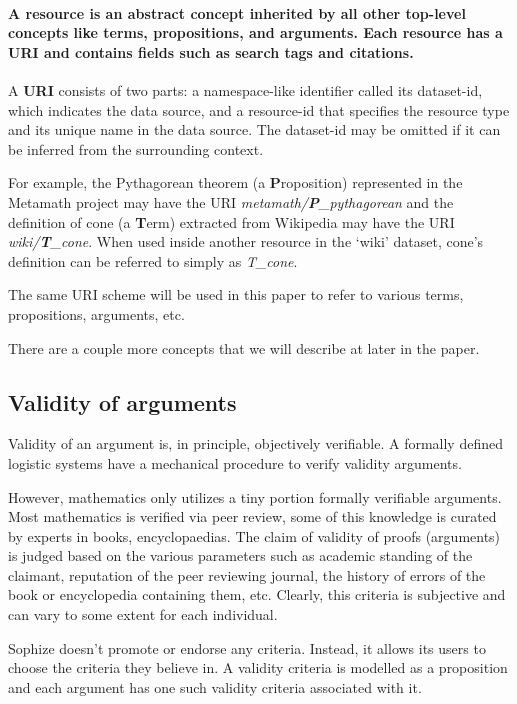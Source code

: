 \documentclass[a4paper]{article}
\begin{document}
\paragraph{A \textbf{resource} is an abstract concept inherited by all other top-level concepts like terms, propositions, and arguments. Each resource has a URI and contains fields such as search tags and citations.}

A \textbf{URI} consists of two parts: a namespace-like identifier called its dataset-id, which indicates the data source, and a resource-id that specifies the resource type and its unique name in the data source. The dataset-id may be omitted if it can be inferred from the surrounding context.

For example, the Pythagorean theorem (a \textbf{P}roposition) represented in the Metamath project may have the URI \emph{metamath/\textbf{P}\_pythagorean} and the definition of cone (a \textbf{T}erm) extracted from Wikipedia may have the URI \emph{wiki/\textbf{T}\_cone}. When used inside another resource in the `wiki' dataset, cone's definition can be referred to simply as \emph{T\_cone}.

The same URI scheme will be used in this paper to refer to various terms, propositions, arguments, etc.

There are a couple more concepts that we will describe at later in the paper.


\subsection{Validity of arguments}
Validity of an argument is, in principle, objectively verifiable. A formally defined logistic systems have a mechanical procedure to verify validity arguments.

However, mathematics only utilizes a tiny portion formally verifiable arguments. Most mathematics is verified via peer review, some of this knowledge is curated by experts in books, encyclopaedias. The claim of validity of proofs (arguments) is judged based on the various parameters such as academic standing of the claimant, reputation of the peer reviewing journal, the history of errors of the book or encyclopedia containing them, etc. Clearly, this criteria is subjective and can vary to some extent for each individual.

Sophize doesn't promote or endorse any criteria. Instead, it allows its users to choose the criteria they believe in. A validity criteria is modelled as a proposition and each argument has one such validity criteria associated with it.
\end{document}
